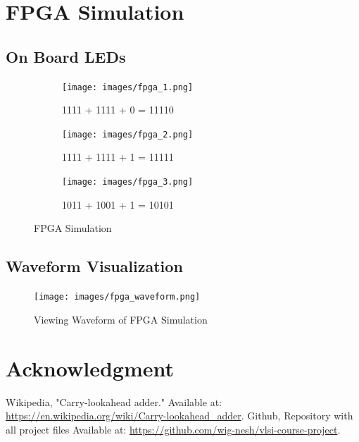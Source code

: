 \documentclass[conference]{IEEEtran}
\begin{document}
\section{FPGA Simulation}

\subsection{On Board LEDs}

\begin{figure}[H]
    \centering
    \begin{subfigure}{0.48\textwidth}
        \texttt{[image: images/fpga\_1.png]}
        \caption{1111 + 1111 + 0 = 11110}
    \end{subfigure}
    \hfill
    \begin{subfigure}{0.48\textwidth}
        \texttt{[image: images/fpga\_2.png]}
        \caption{1111 + 1111 + 1 = 11111}
    \end{subfigure}
    \hfill
    \begin{subfigure}{0.48\textwidth}
        \texttt{[image: images/fpga\_3.png]}
        \caption{1011 + 1001 + 1 = 10101}
    \end{subfigure}
    
    \caption{FPGA Simulation}
    \label{fig:main}
\end{figure}

\subsection{Waveform Visualization}

\begin{figure}[H]
    \centering
    \texttt{[image: images/fpga\_waveform.png]}
    \caption{Viewing Waveform of FPGA Simulation}
\end{figure}

\section*{Acknowledgment}


\begin{thebibliography}{00}
     Wikipedia, "Carry-lookahead adder." Available at: \url{https://en.wikipedia.org/wiki/Carry-lookahead_adder}.
     Github, Repository with all project files Available at: \url{https://github.com/wig-nesh/vlsi-course-project}.
\end{thebibliography}
    
\end{document}
